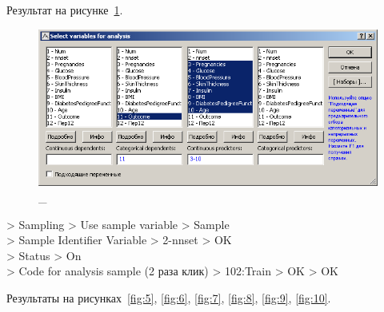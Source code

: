 Результат на рисунке~\ref{fig:4}.

\begin{figure}[!h]
  \centering

  \includegraphics[width=12cm]
  {inc/v5_4.PNG}

  \caption{\_}

  \label{fig:4}
\end{figure}

> Sampling > Use sample variable > Sample \\
> Sample Identifier Variable > 2-nnset > OK \\
> Status > On \\
> Code for analysis sample (2 раза клик) > 102:Train > OK > OK

Результаты на рисунках~\ref{fig:5}, \ref{fig:6}, \ref{fig:7},
\ref{fig:8}, \ref{fig:9}, \ref{fig:10}.

